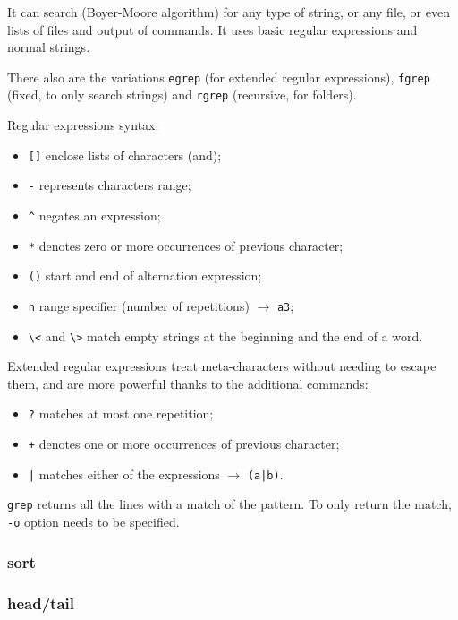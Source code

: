It can search (Boyer-Moore algorithm) for any type of string, or any file, or even lists of files and output of commands. It uses basic regular expressions and normal strings.

There also are the variations \texttt{egrep} (for extended regular expressions), \texttt{fgrep} (fixed, to only search strings) and \texttt{rgrep} (recursive, for folders).

Regular expressions syntax:
\begin{itemize}
	\item \texttt{[]} enclose lists of characters (and);
	\item \texttt{-} represents characters range;
	\item \texttt{\^} negates an expression;
	\item \texttt{*} denotes zero or more occurrences of previous character;
	\item \texttt{()} start and end of alternation expression;
	\item \texttt{{n}} range specifier (number of repetitions) $\rightarrow$ \texttt{a{3}};
	\item \texttt{\textbackslash<} and \texttt{\textbackslash>} match empty strings at the beginning and the end of a word.
\end{itemize}

Extended regular expressions treat meta-characters without needing to escape them, and are more powerful thanks to the additional commands:
\begin{itemize}
	\item \texttt{?} matches at most one repetition;
	\item \texttt{+} denotes one or more occurrences of previous character;
	\item \texttt{|} matches either of the expressions $\rightarrow$ \texttt{(a|b)}.
\end{itemize}

\texttt{grep} returns all the lines with a match of the pattern. To only return the match, \texttt{-o} option needs to be specified.

\subsubsection{sort}

\subsubsection{head/tail}


